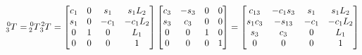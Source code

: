 \documentclass[10pt]{article}
\begin{document}
\[
\tensor*[^{0}_{3}]{T}{} = 
\tensor*[^{0}_{2}]{T}{} \tensor*[^{2}_{3}]{T}{} =
\begin{bmatrix}
    c_{1}        & 0            & s_{1} & s_{1}L_{2}    \\
    s_{1}        & 0            & -c_{1}& -c_{1}L_{2}   \\
    0            & 1            & 0     & L_{1}         \\
    0            & 0            & 0     & 1
\end{bmatrix}
\begin{bmatrix}
    c_{3}        & -s_{3}       & 0     & 0      \\
    s_{3}        & c_{3}        & 0     & 0      \\
    0            & 0            & 1     & 0      \\
    0            & 0            & 0     & 1
\end{bmatrix} =
\begin{bmatrix}
c_{13}           & -c_{1}s_{3}  & s_{1} & s_{1}L_{2}  \\
s_{1}c_{3}       & -s_{13}      & -c_{1}& -c_{1}L_{2} \\
s_{3}            & c_{3}        & 0     & L_{1}       \\
0                & 0            & 0     & 1
\end{bmatrix}
\]
\end{document}
